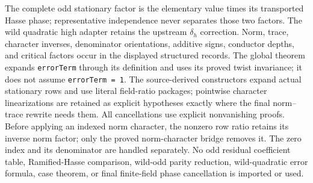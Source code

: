 \begin{definition}
The complete odd stationary factor is the elementary value times its
transported Hasse phase; representative independence never separates those
two factors.  The wild quadratic high adapter retains the upstream
$\delta_h$ correction.  Norm, trace, character inverses, denominator
orientations, additive signs, conductor depths, and critical factors occur
in the displayed structured records.  The global theorem expands
\texttt{errorTerm} through its definition and uses its proved twist
invariance; it does not assume \texttt{errorTerm = 1}.  The source-derived
constructors expand actual stationary rows and use literal field-ratio
packages; pointwise character linearizations are retained as explicit
hypotheses exactly where the final norm--trace rewrite needs them.  All
cancellations use explicit nonvanishing proofs.  Before applying an indexed
norm character, the nonzero row ratio retains its inverse norm factor; only
the proved norm-character bridge removes it.  The zero index and its
denominator are handled separately.  No odd residual coefficient table,
Ramified-Hasse comparison, wild-odd parity reduction, wild-quadratic error
formula, case theorem, or final finite-field phase cancellation is imported
or used.
\end{definition}
